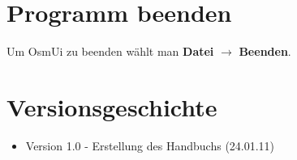 \documentclass[a4paper,10pt]{scrartcl}
\begin{document}

\section{Programm beenden}
Um OsmUi zu beenden wählt man \textbf{Datei} $\rightarrow$ \textbf{Beenden}.

\section{Versionsgeschichte}
\begin{itemize}
\item Version 1.0 - Erstellung des Handbuchs (24.01.11)
\end{itemize}
\end{document}

